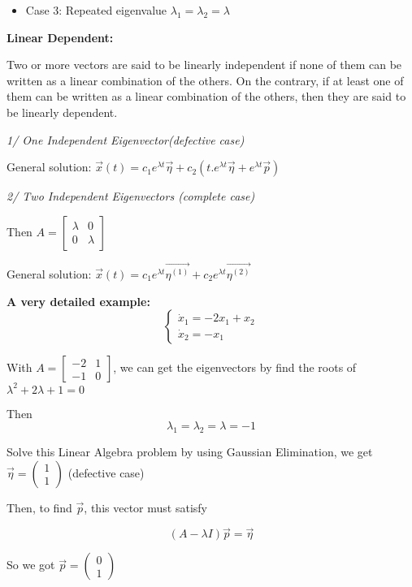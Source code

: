 \documentclass[a4paper]{article}
\begin{document}
\begin{itemize}
	\item Case 3: Repeated eigenvalue $\lambda_{1}=\lambda_{2}=\lambda$
\end{itemize}

{\bf  Linear Dependent:}

Two or more vectors are said to be linearly independent if none of them can be written as a linear combination of the others. On the contrary, if at least one of them can be written as a linear combination of the others, then they are said to be linearly dependent.

{\it  1/ One Independent Eigenvector(defective case)}

General solution: $\vec{x}(t)=c_{1} e^{\lambda t} \vec{\eta}+c_{2}\left(t . e^{\lambda t} \vec{\eta}+e^{\lambda t} \vec{p}\right)$

{\it 2/ Two Independent Eigenvectors (complete case)}

Then $A=\left[\begin{array}{ll}\lambda & 0 \\ 0 & \lambda\end{array}\right]$

General solution: $\vec{x}(t)=c_{1} e^{\lambda t} \overrightarrow{\eta^{(1)}}+c_{2} e^{\lambda t} \overrightarrow{\eta^{(2)}}$

\textbf{A very detailed example:}
$$\left\{\begin{array}{l}\dot{x}_{1}=-2 x_{1}+x_{2} \\ \dot{x}_{2}=-x_{1}\end{array}\right.$$

With $A=\left[\begin{array}{ll}-2 & 1 \\ -1 & 0\end{array}\right]$, we can get the eigenvectors by find the roots of $\lambda^{2}+2 \lambda+1=0$

Then
$$\lambda_{1}=\lambda_{2}=\lambda=-1$$

Solve this Linear Algebra problem by using Gaussian Elimination, we get $\vec{\eta}=\left(\begin{array}{l}1 \\ 1\end{array}\right)$ (defective case)

Then, to find $\vec{p}$, this vector must satisfy

$$(A-\lambda I) \vec{p}=\vec{\eta}$$

So we got $\vec{p}=\left(\begin{array}{l}0 \\ 1\end{array}\right)$
\end{document}
